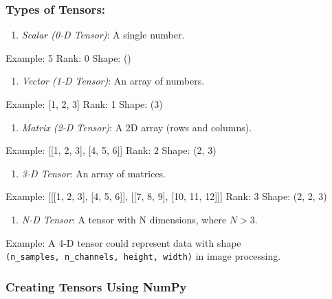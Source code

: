 \documentclass[
  letterpaper,
  DIV=11,
  numbers=noendperiod]{scrreprt}
\providecommand{\tightlist}{%
  \setlength{\itemsep}{0pt}\setlength{\parskip}{0pt}}\usepackage{longtable,booktabs,array}
\theoremstyle{plain}
\theoremstyle{definition}
\theoremstyle{remark}
\begin{document}
\subsubsection{Types of Tensors:}\label{types-of-tensors}

\begin{enumerate}
\def\labelenumi{\arabic{enumi}.}
\tightlist
\item
  \emph{Scalar (0-D Tensor)}: A single number.
\end{enumerate}

Example: 5 Rank: 0 Shape: ()

\begin{enumerate}
\def\labelenumi{\arabic{enumi}.}
\setcounter{enumi}{1}
\tightlist
\item
  \emph{Vector (1-D Tensor)}: An array of numbers.
\end{enumerate}

Example: {[}1, 2, 3{]} Rank: 1 Shape: (3)

\begin{enumerate}
\def\labelenumi{\arabic{enumi}.}
\setcounter{enumi}{2}
\tightlist
\item
  \emph{Matrix (2-D Tensor)}: A 2D array (rows and columns).
\end{enumerate}

Example: {[}{[}1, 2, 3{]}, {[}4, 5, 6{]}{]} Rank: 2 Shape: (2, 3)

\begin{enumerate}
\def\labelenumi{\arabic{enumi}.}
\setcounter{enumi}{3}
\tightlist
\item
  \emph{3-D Tensor}: An array of matrices.
\end{enumerate}

Example: {[}{[}{[}1, 2, 3{]}, {[}4, 5, 6{]}{]}, {[}{[}7, 8, 9{]}, {[}10,
11, 12{]}{]}{]} Rank: 3 Shape: (2, 2, 3)

\begin{enumerate}
\def\labelenumi{\arabic{enumi}.}
\setcounter{enumi}{4}
\tightlist
\item
  \emph{N-D Tensor}: A tensor with N dimensions, where \(N > 3\).
\end{enumerate}

Example: A 4-D tensor could represent data with shape
\texttt{(n\_samples,\ n\_channels,\ height,\ width)} in image
processing.

\subsubsection{Creating Tensors Using
NumPy}\label{creating-tensors-using-numpy}
\end{document}
